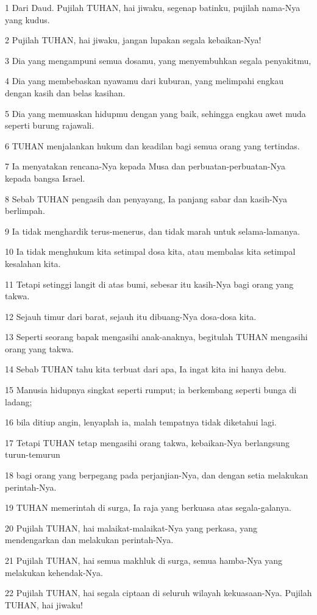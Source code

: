 \par 1 Dari Daud. Pujilah TUHAN, hai jiwaku, segenap batinku, pujilah nama-Nya yang kudus.
\par 2 Pujilah TUHAN, hai jiwaku, jangan lupakan segala kebaikan-Nya!
\par 3 Dia yang mengampuni semua dosamu, yang menyembuhkan segala penyakitmu,
\par 4 Dia yang membebaskan nyawamu dari kuburan, yang melimpahi engkau dengan kasih dan belas kasihan.
\par 5 Dia yang memuaskan hidupmu dengan yang baik, sehingga engkau awet muda seperti burung rajawali.
\par 6 TUHAN menjalankan hukum dan keadilan bagi semua orang yang tertindas.
\par 7 Ia menyatakan rencana-Nya kepada Musa dan perbuatan-perbuatan-Nya kepada bangsa Israel.
\par 8 Sebab TUHAN pengasih dan penyayang, Ia panjang sabar dan kasih-Nya berlimpah.
\par 9 Ia tidak menghardik terus-menerus, dan tidak marah untuk selama-lamanya.
\par 10 Ia tidak menghukum kita setimpal dosa kita, atau membalas kita setimpal kesalahan kita.
\par 11 Tetapi setinggi langit di atas bumi, sebesar itu kasih-Nya bagi orang yang takwa.
\par 12 Sejauh timur dari barat, sejauh itu dibuang-Nya dosa-dosa kita.
\par 13 Seperti seorang bapak mengasihi anak-anaknya, begitulah TUHAN mengasihi orang yang takwa.
\par 14 Sebab TUHAN tahu kita terbuat dari apa, Ia ingat kita ini hanya debu.
\par 15 Manusia hidupnya singkat seperti rumput; ia berkembang seperti bunga di ladang;
\par 16 bila ditiup angin, lenyaplah ia, malah tempatnya tidak diketahui lagi.
\par 17 Tetapi TUHAN tetap mengasihi orang takwa, kebaikan-Nya berlangsung turun-temurun
\par 18 bagi orang yang berpegang pada perjanjian-Nya, dan dengan setia melakukan perintah-Nya.
\par 19 TUHAN memerintah di surga, Ia raja yang berkuasa atas segala-galanya.
\par 20 Pujilah TUHAN, hai malaikat-malaikat-Nya yang perkasa, yang mendengarkan dan melakukan perintah-Nya.
\par 21 Pujilah TUHAN, hai semua makhluk di surga, semua hamba-Nya yang melakukan kehendak-Nya.
\par 22 Pujilah TUHAN, hai segala ciptaan di seluruh wilayah kekuasaan-Nya. Pujilah TUHAN, hai jiwaku!

